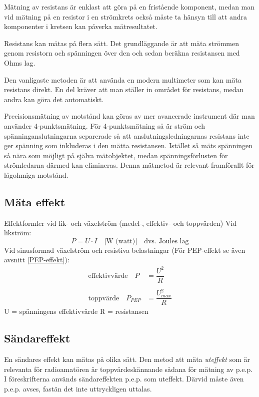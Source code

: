 Mätning av resistans är enklast att göra på en fristående komponent,
medan man vid mätning på en resistor i en strömkrets också måste ta
hänsyn till att andra komponenter i kretsen kan påverka mätresultatet.

Resistans kan mätas på flera sätt.
Det grundläggande är att mäta strömmen genom resistorn och spänningen över den
och sedan beräkna resistansen med Ohms lag.

Den vanligaste metoden är att använda en modern multimeter som kan mäta
resistans direkt.
En del kräver att man ställer in området för resistans, medan andra
kan göra det automatiskt.

Precisionsmätning av motstånd kan göras av mer avancerade instrument
där man använder 4-punkts\-mätning.
För 4-punktsmätning så är ström och spänninganslutningarna separerade
så att anslutningsledningarnas resistans inte ger spänning som inkluderas
i den mätta resistansen.
Istället så mäts spänningen så nära som möjligt på själva mätobjektet,
medan spänningsförlusten för strömledarna därmed kan elimineras.
Denna mätmetod är relevant framförallt för lågohmiga motstånd.

\subsection{Mäta effekt}
\label{mätaeffekt}

Effektformler vid lik- och växelström (medel-, effektiv- och toppvärden)
Vid likström:
%
\[
P = U \cdot I \quad \text{[W (watt)]} \quad \text{dvs. Joules lag}
\]
Vid sinusformad växelström och resistiva belastningar
(För PEP-effekt se även avsnitt \ref{PEP-effekt}):
\[
\begin{array}{ll}
\text{effektivvärde} \quad P & = \dfrac{U^2}{R} \\
&\\
\text{toppvärde}     \quad P_{PEP} & = \dfrac{U_{max}^2}{R}
\end{array}
\]
U = spänningens effektivvärde
R = resistansen

\subsection{Sändareffekt}

En sändares effekt kan mätas på olika sätt.
Den metod att mäta \emph{uteffekt} som är relevanta för radioamatören är
toppvärdeskännande sådana för mätning av p.e.p.
I föreskrifterna används sändareffekten p.e.p. som uteffekt.
Därvid måste även p.e.p. avses, fastän det inte uttryckligen uttalas.


